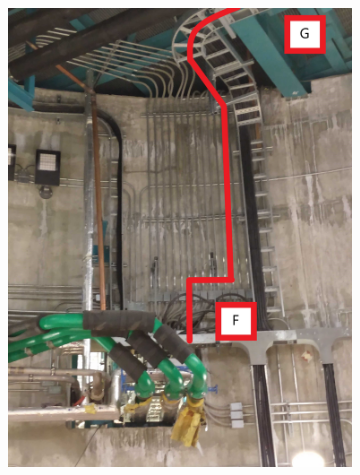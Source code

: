   \begin{figure}
    \centering
    \begin{subfigure}{0.48\textwidth}
      \centering
      \includegraphics[width=\textwidth]{images/19.jpg}
    \end{subfigure}
   \hfill
    \begin{subfigure}{0.48\textwidth}
      \centering

\end{subfigure}
\end{figure}
